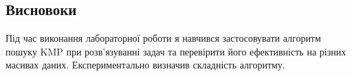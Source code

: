 \documentclass{article}
\begin{document}
\begin{normalsize}
		\section*{Висновоки}
		Під час виконання лабораторної роботи я навчився застосовувати алгоритм пошуку KMP при розв’язуванні задач та перевірити його ефективність на різних масивах даних. Експериментально визначив складність алгоритму. 
		
	\end{normalsize}
\end{document}
